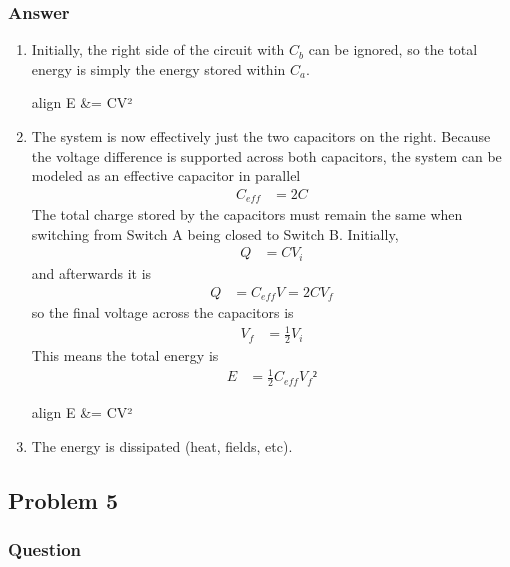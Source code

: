 \subsubsection{Answer}
\begin{enumerate}
	\item
		Initially, the right side of the circuit with $C_b$ can be ignored, 
		so the total energy is simply the energy stored within $C_a$.
		\begin{empheq}[box=\fbox]{align}
			E &=  CV²
		\end{empheq}
	\item
		The system is now effectively just the two capacitors on the right.
		Because the voltage difference is supported across both capacitors,
		the system can be modeled as an effective capacitor in parallel
		\begin{align*}
			C_{eff} &= 2C
		\end{align*}
		The total charge stored by the capacitors must remain the same when
		switching from Switch A being closed to Switch B. Initially,
		\begin{align*}
			Q &= CV_i
		\end{align*}
		and afterwards it is
		\begin{align*}
			Q &= C_{eff}V = 2CV_f
		\end{align*}
		so the final voltage across the capacitors is
		\begin{align*}
			V_f &= \frac 12 V_i
		\end{align*}
		This means the total energy is
		\begin{align*}
			E &= \frac 12 C_{eff} {V_f}²
		\end{align*}
		\begin{empheq}[box=\fbox]{align}
			E &=  CV²
		\end{empheq}
	\item
		The energy is dissipated (heat, fields, etc).
\end{enumerate}

\clearpage
\subsection{Problem 5}
\subsubsection{Question}

